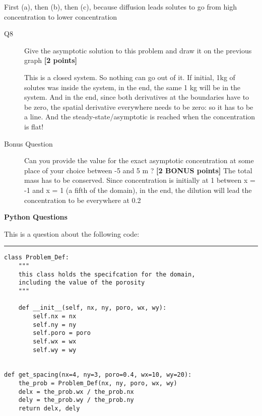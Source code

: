 \documentclass{article}
\newcommand{\ans}[1]{\textcolor{dark-green}{#1}}
\begin{document}

\ans{First (a), then (b), then (c), because diffusion leads solutes to go from high concentration to lower concentration}

\begin{description}
\item [Q8] Give the asymptotic solution to this problem and draw it on the previous graph  \textbf{[2 points]}

\ans{This is a closed system. So nothing can go out of it. If initial, 1kg of solutes was inside the system, in the end, the same 1 kg will be in the system. And in the end, since both derivatives at the boundaries have to be zero, the spatial derivative everywhere needs to be zero: so it has to be a line. And the steady-state/asymptotic is reached when the concentration is flat! }

\item[Bonus Question] Can you provide the value for the exact asymptotic concentration at some place of your choice between -5 and 5 m ? \textbf{[2 BONUS points]}
\ans{The total mass has to be conserved. Since concentration is initially at 1 between x = -1 and x = 1 (a fifth of the domain), in the end, the dilution will lead the concentration to be everywhere at 0.2 }

\end{description}


\newpage
\textbf{Python Questions}


This is a question about the following code:

\rule{15cm}{0.75pt}


\begin{verbatim}
class Problem_Def:
    """
    this class holds the specifcation for the domain,
    including the value of the porosity
    """

    def __init__(self, nx, ny, poro, wx, wy):
        self.nx = nx
        self.ny = ny
        self.poro = poro
        self.wx = wx
        self.wy = wy


def get_spacing(nx=4, ny=3, poro=0.4, wx=10, wy=20):
    the_prob = Problem_Def(nx, ny, poro, wx, wy)
    delx = the_prob.wx / the_prob.nx
    dely = the_prob.wy / the_prob.ny
    return delx, dely
\end{verbatim}
\end{document}
